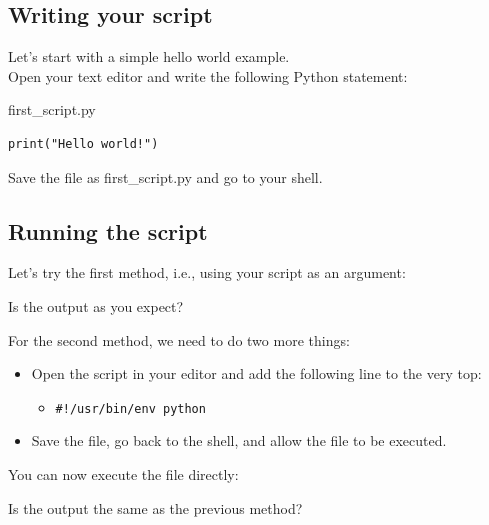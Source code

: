 \documentclass[aspectratio=1610,slidestop]{beamer}
\begin{document}
\subsection{Writing your script}
\begin{pframe}
 Let's start with a simple hello world example.\\

 Open your text editor and write the following Python statement:

 \begin{pythonfile}{first\_script.py}
  \begin{verbatim}
print("Hello world!")
  \end{verbatim}
 \end{pythonfile}
Save the file as first\_script.py and go to your shell.
\end{pframe}

\subsection{Running the script}
\begin{pframe}
 Let's try the first method, i.e., using your script as an argument:
 \begin{terminal}
 \end{terminal}
  Is the output as you expect?
\end{pframe}

\begin{pframe}
  For the second method, we need to do two more things:
  \begin{itemize}
   \item Open the script in your editor and add the following line to the very
   top:
   \begin{itemize}
    \item \texttt{#!/usr/bin/env python}
   \end{itemize}
   \item Save the file, go back to the shell, and allow the file to be executed.
  \end{itemize}
 \begin{terminal}
 \end{terminal}
You can now execute the file directly:
\begin{terminal}
 \end{terminal}
 Is the output the same as the previous method?
\end{pframe}
\end{document}
